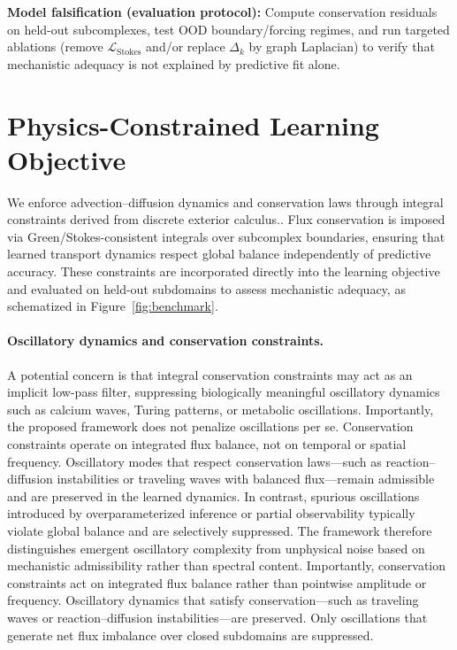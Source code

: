 \documentclass[10pt,article]{article}
\begin{document}
\medskip
\noindent\textbf{Model falsification (evaluation protocol):}
Compute conservation residuals on held-out subcomplexes, test OOD boundary/forcing regimes,
and run targeted ablations (remove $\mathcal{L}_{\mathrm{Stokes}}$ and/or replace $\Delta_k$ by graph Laplacian)
to verify that mechanistic adequacy is not explained by predictive fit alone.

\section{Physics-Constrained Learning Objective}

We enforce advection--diffusion dynamics and conservation laws through integral constraints derived from
discrete exterior calculus.\cite{raissi2019physics}. Flux conservation is imposed via Green/Stokes-consistent integrals over subcomplex
boundaries, ensuring that learned transport dynamics respect global balance independently of predictive
accuracy. These constraints are incorporated directly into the learning objective and evaluated on held-out
subdomains to assess mechanistic adequacy, as schematized in Figure~\ref{fig:benchmark}.

\paragraph{Oscillatory dynamics and conservation constraints.}
A potential concern is that integral conservation constraints may act as an implicit low-pass filter, suppressing biologically meaningful oscillatory dynamics such as calcium waves, Turing patterns, or metabolic oscillations. Importantly, the proposed framework does not penalize oscillations per se. Conservation constraints operate on integrated flux balance, not on temporal or spatial frequency. Oscillatory modes that respect conservation laws—such as reaction–diffusion instabilities or traveling waves with balanced flux—remain admissible and are preserved in the learned dynamics. In contrast, spurious oscillations introduced by overparameterized inference or partial observability typically violate global balance and are selectively suppressed. The framework therefore distinguishes emergent oscillatory complexity from unphysical noise based on mechanistic admissibility rather than spectral content.
Importantly, conservation constraints act on integrated flux balance rather than pointwise amplitude or frequency. Oscillatory dynamics that satisfy conservation---such as traveling waves or reaction--diffusion instabilities---are preserved. Only oscillations that generate net flux imbalance over closed subdomains are suppressed.
\end{document}
